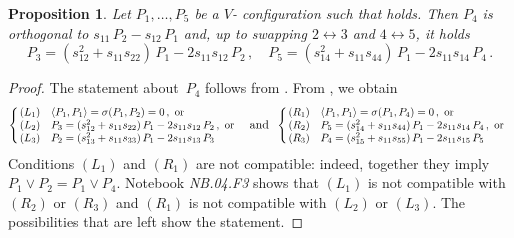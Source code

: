 \documentclass[a4paper, 11pt, reqno]{amsart}
\theoremstyle{plain}
\newtheorem{prop}[lemma]{Proposition}
\theoremstyle{definition}
\newcommand{\nb}[2]{\textsl{{NB}.{#1}.{#2}}}
\newcommand\scalemath[2]{\scalebox{#1}{\mbox{\ensuremath{\displaystyle #2}}}}
\begin{document}
\begin{prop}
\label{proposition:char_rank_8}
  Let $P_1, \dotsc, P_5$ be a $V$- configuration such that  holds.
  Then $P_4$ is orthogonal to $s_{11} \, P_2 - s_{12} \, P_1$ and, up to swapping $2 \leftrightarrow 3$ and $4 \leftrightarrow 5$, it holds
  \[
   P_3 = (s_{12}^2+s_{11}s_{22}) \, P_1 - 2s_{11}s_{12} \, P_2 \,, \quad
   P_5 = (s_{14}^2+s_{11}s_{44}) \, P_1 - 2s_{11}s_{14} \, P_4 \,.
  \]
\end{prop}
\begin{proof}
  The statement about~$P_4$ follows from .
  From , we obtain
  \[
  \left\{ \!\!
  \scalemath{0.9}{
  \begin{array}{ll}
  (L_1) & \left\langle P_1, P_1 \right\rangle = \sigma(P_1, P_2) = 0 \,, \text{ or} \\
  (L_2) & P_3 = (s_{12}^2+s_{11}s_{22}) \, P_1 - 2s_{11}s_{12} \, P_2 \,, \text{ or} \\
  (L_3) & P_2 = (s_{13}^2+s_{11}s_{33}) \, P_1 - 2s_{11}s_{13} \, P_3
  \end{array}
  }
  \right.
  \;\; \text{and} \;\;
  \left\{ \!\!
  \scalemath{0.9}{
  \begin{array}{ll}
  (R_1) & \left\langle P_1, P_1 \right\rangle = \sigma(P_1, P_4) = 0 \,, \text{ or} \\
  (R_2) & P_5 = (s_{14}^2+s_{11}s_{44}) \, P_1 - 2s_{11}s_{14} \, P_4 \,, \text{ or} \\
  (R_3) & P_4 = (s_{15}^2+s_{11}s_{55}) \, P_1 - 2s_{11}s_{15} \, P_5
  \end{array}
  }
  \right.
  \]
  Conditions $(L_1)$ and $(R_1)$ are not compatible: indeed, together they imply $P_1 \vee P_2 = P_1 \vee P_4$.
  Notebook \nb{04}{F3} shows that $(L_1)$ is not compatible with $(R_2)$ or $(R_3)$ and $(R_1)$ is not compatible with $(L_2)$ or $(L_3)$.
  The possibilities that are left show the statement.
\end{proof}
\end{document}

